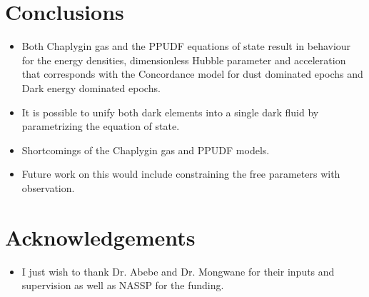 \documentclass[8pt,hideothersubsections]{beamer}
\begin{document}
\section{Conclusions}
\begin{frame}
\begin{itemize}
\frametitle{\insertsectionhead}

\item Both Chaplygin gas and the PPUDF equations of state result in behaviour for the energy densities, dimensionless Hubble parameter and acceleration that corresponds with the Concordance model for dust dominated epochs and Dark energy dominated epochs.\\
\hspace{2pt}

\item It is possible to unify both dark elements into a single dark fluid by parametrizing the equation of state.\\
\hspace{2pt}

\item Shortcomings of the Chaplygin gas and PPUDF models.\\
\hspace{2pt}


\item Future work on this would include constraining the free parameters with observation. 

\end{itemize}
\end{frame}

\section{Acknowledgements}
\begin{frame}
\begin{itemize}
\frametitle{\insertsectionhead}

\item I just wish to thank Dr. Abebe and Dr. Mongwane for their inputs and supervision as well as NASSP for the funding.
\end{itemize}
\end{frame}


\begin{frame}
                               
 
\end{frame}
\end{document}

